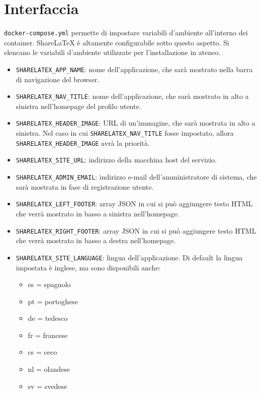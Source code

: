 \section{Interfaccia}
\verb|docker-compose.yml| permette di impostare variabili d'ambiente all'interno dei container. ShareLaTeX è altamente configurabile sotto questo aspetto. Si elencano le variabili d'ambiente utilizzate per l'installazione in ateneo.
\begin{itemize}
    \item \verb|SHARELATEX_APP_NAME|: nome dell'applicazione, che sarà mostrato nella barra di navigazione del browser.
    \item \verb|SHARELATEX_NAV_TITLE|: nome dell'applicazione, che sarà mostrato in alto a sinistra nell'homepage del profilo utente.
    \item \verb|SHARELATEX_HEADER_IMAGE|: URL di un'immagine, che sarà mostrata in alto a sinistra. Nel caso in cui \verb|SHARELATEX_NAV_TITLE| fosse impostato, allora\\\verb|SHARELATEX_HEADER_IMAGE| avrà la priorità.
    \item \verb|SHARELATEX_SITE_URL|: indirizzo della macchina host del servizio.
    \item \verb|SHARELATEX_ADMIN_EMAIL|: indirizzo e-mail dell'amministratore di sistema, che sarà mostrata in fase di registrazione utente.
    \item \verb|SHARELATEX_LEFT_FOOTER|: array JSON in cui si può aggiungere testo HTML che verrà mostrato in basso a sinistra nell'homepage.
    \item \verb|SHARELATEX_RIGHT_FOOTER|: array JSON in cui si può aggiungere testo HTML che verrà mostrato in basso a destra nell'homepage.
    \item \verb|SHARELATEX_SITE_LANGUAGE|: lingua dell'applicazione. Di default la lingua impostata è inglese, ma sono disponibili anche:
        \begin{multicols}{3}
            \begin{itemize}
                \item es = spagnolo
                \item pt = portoghese
                \item de = tedesco
                \item fr = francese
                \item cs = ceco
                \item nl = olandese
                \item sv = svedese

\end{itemize}
\end{multicols}
\end{itemize}
